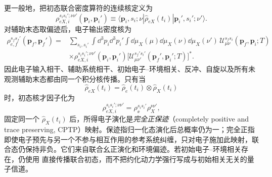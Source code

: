 更一般地，把初态联合密度算符的连续核定义为
\[
\rho_{eX,i}^{s_i s_i';\nu\nu'}(\mathbf p_i,\mathbf p_i')
\equiv
\langle\mathbf p_i,s_i;\nu|\hat\rho_{eX}(t_i)
|\mathbf p_i',s_i';\nu'\rangle .
\]
对辅助末态取偏迹后，电子输出密度核为
\begin{equation}
\boxed{
\begin{aligned}
\rho_{e,f}^{s_f s_f'}(\mathbf p_f,\mathbf p_f')
={}&\sum_{s_i,s_i'}
\int\dd^3p_i\dd^3p_i'
\int\dd\mu_X(\mu)\dd\mu_X(\nu)\dd\mu_X(\nu')\,
\mathscr U_{\mu\nu}^{s_f s_i}
(\mathbf p_f,\mathbf p_i;T)\\
&\times
\rho_{eX,i}^{s_i s_i';\nu\nu'}(\mathbf p_i,\mathbf p_i')
\bigl[\mathscr U_{\mu\nu'}^{s_f' s_i'}
(\mathbf p_f',\mathbf p_i';T)\bigr]^* .
\end{aligned}}
\label{eq:exact_reduced_electron_channel_kernel}
\end{equation}
因此电子输入相干、辅助系统相干、初始电子--环境相关、反冲、自旋以及所有未观测辅助末态都由同一个积分核传播。只有当
\[
\hat\rho_{eX}(t_i)=\hat\rho_e(t_i)\otimes\hat\rho_X(t_i)
\]
时，初态核才因子化为
\[
\rho_{eX,i}^{s_i s_i';\nu\nu'}
=\rho_\ee^{s_i s_i'}\rho_X^{\nu\nu'},
\]
固定同一个 $\hat\rho_X(t_i)$ 后，所得电子演化是\emph{完全正保迹}（completely positive and trace preserving, CPTP）映射。保迹指归一化态演化后总概率仍为一；完全正指即使电子预先与另一个不参与相互作用的参考系统纠缠，只对电子施加此映射，联合态仍保持非负。它们来自联合幺正演化和环境偏迹。若初始电子--环境相关存在，仍使用 直接传播联合初态，而不把约化动力学强行写成与初始相关无关的量子信道。

